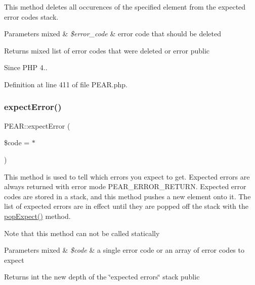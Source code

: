 This method deletes all occurences of the specified element from the expected error codes stack.


\begin{DoxyParams}[1]{Parameters}
mixed & {\em \$error\+\_\+code} & error code that should be deleted \\
\hline
\end{DoxyParams}
\begin{DoxyReturn}{Returns}
mixed list of error codes that were deleted or error  public 
\end{DoxyReturn}
\begin{DoxySince}{Since}
P\+HP 4.. 
\end{DoxySince}


Definition at line 411 of file P\+E\+A\+R.\+php.

\hypertarget{classPEAR_a99f53f3623ab2fdbb046d85711e36a65}{}\label{classPEAR_a99f53f3623ab2fdbb046d85711e36a65} 
\subsubsection{\texorpdfstring{expect\+Error()}{expectError()}}
{\footnotesize\ttfamily P\+E\+A\+R\+::expect\+Error (\begin{DoxyParamCaption}\item[{}]{\$code = {\ttfamily \textquotesingle{}$\ast$\textquotesingle{}} }\end{DoxyParamCaption})}

This method is used to tell which errors you expect to get. Expected errors are always returned with error mode P\+E\+A\+R\+\_\+\+E\+R\+R\+O\+R\+\_\+\+R\+E\+T\+U\+RN. Expected error codes are stored in a stack, and this method pushes a new element onto it. The list of expected errors are in effect until they are popped off the stack with the \hyperlink{classPEAR_a3ea2df43e39214a29f77f8773a5afcc4}{pop\+Expect()} method.

Note that this method can not be called statically


\begin{DoxyParams}[1]{Parameters}
mixed & {\em \$code} & a single error code or an array of error codes to expect\\
\hline
\end{DoxyParams}
\begin{DoxyReturn}{Returns}
int the new depth of the \char`\"{}expected errors\char`\"{} stack  public 
\end{DoxyReturn}


